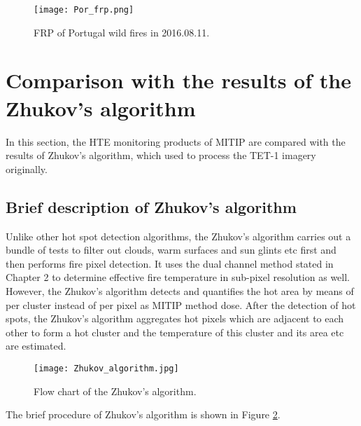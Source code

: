 \begin{figure}[!htbp]
\centering
\texttt{[image: Por\_frp.png]}
\caption{FRP of Portugal wild fires in 2016.08.11.}
\label{fig:Por_frp}
\end{figure}


\section{Comparison with the results of the Zhukov's algorithm}
In this section, the HTE monitoring products of MITIP are compared with the results of Zhukov's algorithm, which used to process the TET-1 imagery originally.\\


\subsection{Brief description of Zhukov's algorithm}
Unlike other hot spot detection algorithms, the Zhukov's algorithm carries out a bundle of tests to filter out clouds, warm surfaces and sun glints etc first and then performs fire pixel detection. It uses the dual channel method stated in Chapter 2 to determine effective fire temperature in sub-pixel resolution as well. However, the Zhukov's algorithm detects and quantifies the hot area by means of per cluster instead of per pixel as MITIP method dose. After the detection of hot spots, the Zhukov's algorithm aggregates hot pixels which are adjacent to each other to form a hot cluster and the temperature of this cluster and its area etc are estimated.\\

\begin{figure}[!htbp]
\centering
\texttt{[image: Zhukov\_algorithm.jpg]}
\caption{Flow chart of the Zhukov's algorithm.}
\label{fig:Zhu_alg}
\end{figure}

\noindent The brief procedure of Zhukov's algorithm is shown in Figure \ref{fig:Zhu_alg}.\\


